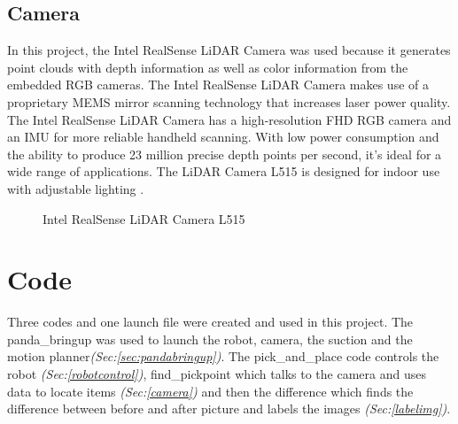\subsection{Camera\label{subsec:camera}} 
In this project, the Intel RealSense LiDAR Camera was used because it generates point clouds with depth information as well as color information from the embedded RGB cameras. The Intel RealSense LiDAR Camera makes use of a proprietary MEMS mirror scanning technology that increases laser power quality. The Intel RealSense LiDAR Camera has a high-resolution FHD RGB camera and an IMU for more reliable handheld scanning. With low power consumption and the ability to produce 23 million precise depth points per second, it's ideal for a wide range of applications. The LiDAR Camera L515 is designed for indoor use with adjustable lighting \cite{noauthor_intel_nodate}.
\begin{figure}[h]
    \centering
    \hfill
    \caption{Intel RealSense LiDAR Camera L515 \cite{noauthor_intel_nodate}}
    \label{figure: lidar}
\end{figure}
\clearpage

\section{Code}
Three codes and one launch file were created and used in this project. The panda\_bringup was used to launch the robot, camera, the suction and the motion planner\textit{(Sec:\ref{sec:pandabringup})}. 
The pick\_and\_place code controls the robot \textit{(Sec:\ref{robotcontrol})}, find\_pickpoint which talks to the camera and uses data to locate items \textit{(Sec:\ref{camera})} and then the difference which finds the difference between before and after picture and labels the images \textit{(Sec:\ref{labelimg})}.

